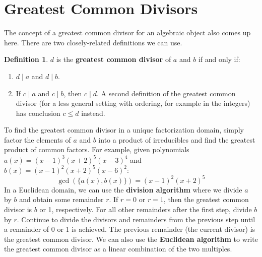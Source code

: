 \documentclass[11pt]{amsart}
\theoremstyle{definition}
\newtheorem{definition}[theorem]{Definition}
\begin{document}
\section{Greatest Common Divisors}
The concept of a greatest common divisor for an algebraic object also comes up here. There are two closely-related definitions we can use.
\begin{definition}
	$d$ is the \textbf{greatest common divisor} of $a$ and $b$ if and only if:
	\begin{enumerate}
		\item{
			$d \mid a$ and $d \mid b$.
		}
		\item{
			If $c \mid a$ and $c \mid b$, then $c \mid d$. A second definition of the greatest common divisor (for a less general setting with
			ordering, for example in the integers) has conclusion $c \leq d$ instead.
		}
	\end{enumerate}
\end{definition}
To find the greatest common divisor in a unique factorization domain, simply factor the elements of $a$ and $b$ into a product of irreducibles
and find the greatest product of common factors. For example, given polynomials $a(x) = (x-1)^3(x+2)^5(x-3)^4$ and $b(x) = (x-1)^2(x+2)^5(x-6)^2$:
\[
	\gcd(\{ a(x), b(x) \}) = (x-1)^2(x+2)^5
\]
In a Euclidean domain, we can use the \textbf{division algorithm} where we divide $a$ by $b$ and obtain some remainder $r$.
If $r = 0$ or $r = 1$, then the greatest common divisor is $b$ or 1, respectively. For all other remainders after the first step, divide $b$ 
by $r$. Continue to divide the divisors and remainders from the previous step until a remainder of 0 or 1 is achieved. The previous remainder
(the current divisor) is the greatest common divisor. We can also use the \textbf{Euclidean algorithm} to write the greatest common divisor
as a linear combination of the two multiples.
\newpage
\end{document}
